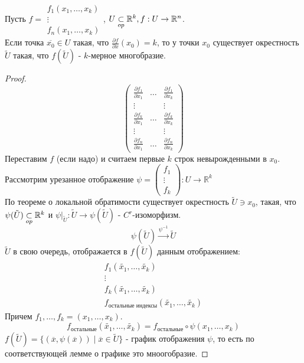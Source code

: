 \begin{lemma*}
    Пусть $f = \begin{array}{c}
        f_1(x_1, \hdots, x_k) \\
        \vdots \\
        f_n(x_1, \hdots, x_k)
    \end{array}$, $U \underset{op}{\subset} \mathbb{R}^k, f: U \to \mathbb{R}^n$.\\
    Если точка $\overline{x_0} \in U$ такая, что $\frac{\partial f}{\partial x}(x_0) = k$, то у точки $x_0$ существует окрестность $\tilde{U}$ такая, что $f(\tilde{U})$ - $k$-мерное многобразие.

    \begin{proof}
        \[\begin{pmatrix}
            \frac{\partial f_1}{\partial x_1} & \hdots & \frac{\partial f_1}{\partial x_k} \\
            \vdots & & \vdots\\
            \frac{\partial f_k}{\partial x_1} & \hdots & \frac{\partial f_k}{\partial x_k} \\
            \vdots & & \vdots\\
            \frac{\partial f_n}{\partial x_1} & \hdots & \frac{\partial f_n}{\partial x_k}
        \end{pmatrix}\]
        Переставим $f$ (если надо) и считаем первые $k$ строк невырожденными в $x_0$.
        Рассмотрим урезанное отображение $\psi = (\begin{array}{c} f_1 \\ \vdots \\ f_k \end{array}): U \to \mathbb{R}^k$\\
        По теореме о локальной обратимости существует окрестность $\tilde{U} \ni x_0$, такая, что 
        $\psi(\tilde{U}) \underset{op}{\subset} \mathbb{R}^k$ и $\psi|_{\tilde{U}}: \tilde{U} \to \psi(\tilde{U})$ - $C^r$-изоморфизм.
        \[\psi(\tilde{U}) \overset{\psi^{-1}}{\to} \tilde{U}\]
        $\tilde{U}$ в свою очередь, отображается в $f(\tilde{U})$ данным отображением:
        \[\begin{array}{c}
            f_1(\tilde{x_1}, \hdots, \tilde{x_k}) \\
            \vdots \\
            f_k(\tilde{x_1}, \hdots, \tilde{x_k}) \\
            f_{\text{остальные индексы}}(\tilde{x_1}, \hdots, \tilde{x_k})
        \end{array}\]
        Причем $f_1, \hdots, f_k = (x_1, \hdots, x_k)$. 
        \[f_{\text{остальные}}(\tilde{x_1}, \hdots, \tilde{x_k}) = f_{\text{остальные}}\circ \psi(x_1, \hdots, x_k)\]
        $f(\tilde{U})= \{(\overline{x}, \psi(\overline{x})) \mid \overline{x} \in \tilde{U}\}$ - график отображения $\psi$, то есть по соответствующей лемме о графике это мноогобразие.
    \end{proof}
\end{lemma*}